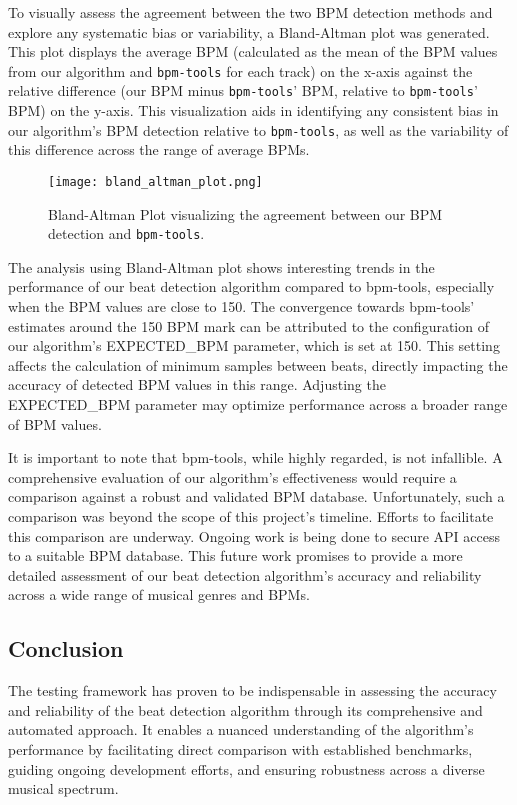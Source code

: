 To visually assess the agreement between the two BPM detection methods and explore any systematic bias or variability, a Bland-Altman plot was generated. This plot displays the average BPM (calculated as the mean of the BPM values from our algorithm and \texttt{bpm-tools} for each track) on the x-axis against the relative difference (our BPM minus \texttt{bpm-tools}' BPM, relative to \texttt{bpm-tools}' BPM) on the y-axis. This visualization aids in identifying any consistent bias in our algorithm's BPM detection relative to \texttt{bpm-tools}, as well as the variability of this difference across the range of average BPMs.

\begin{figure}[H]
\centering
\texttt{[image: bland\_altman\_plot.png]}
\caption{Bland-Altman Plot visualizing the agreement between our BPM detection and \texttt{bpm-tools}.}
\end{figure}

The analysis using Bland-Altman plot shows interesting trends in the performance of our beat detection algorithm compared to bpm-tools, especially when the BPM values are close to 150. The convergence towards bpm-tools' estimates around the 150 BPM mark can be attributed to the configuration of our algorithm's EXPECTED\_BPM parameter, which is set at 150. This setting affects the calculation of minimum samples between beats, directly impacting the accuracy of detected BPM values in this range.   Adjusting the EXPECTED\_BPM parameter may optimize performance across a broader range of BPM values.

It is important to note that bpm-tools, while highly regarded, is not infallible. A comprehensive evaluation of our algorithm's effectiveness would require a comparison against a robust and validated BPM database. Unfortunately, such a comparison was beyond the scope of this project's timeline. Efforts to facilitate this comparison are underway. Ongoing work is being done to secure API access to a suitable BPM database. This future work promises to provide a more detailed assessment of our beat detection algorithm's accuracy and reliability across a wide range of musical genres and BPMs.

\subsection{Conclusion}

The testing framework has proven to be indispensable in assessing the accuracy and reliability of the beat detection algorithm through its comprehensive and automated approach. It enables a nuanced understanding of the algorithm's performance by facilitating direct comparison with established benchmarks, guiding ongoing development efforts, and ensuring robustness across a diverse musical spectrum.

